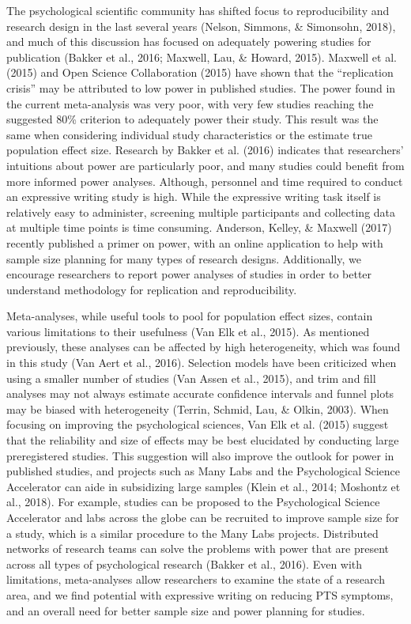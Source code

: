 \documentclass[man, mask]{apa6}
\theoremstyle{definition}
\theoremstyle{definition}
\theoremstyle{definition}
\theoremstyle{remark}
\begin{document}
The psychological scientific community has shifted focus to
reproducibility and research design in the last several years (Nelson,
Simmons, \& Simonsohn, 2018), and much of this discussion has focused on
adequately powering studies for publication (Bakker et al., 2016;
Maxwell, Lau, \& Howard, 2015). Maxwell et al. (2015) and Open Science
Collaboration (2015) have shown that the \enquote{replication crisis}
may be attributed to low power in published studies. The power found in
the current meta-analysis was very poor, with very few studies reaching
the suggested 80\% criterion to adequately power their study. This
result was the same when considering individual study characteristics or
the estimate true population effect size. Research by Bakker et al.
(2016) indicates that researchers' intuitions about power are
particularly poor, and many studies could benefit from more informed
power analyses. Although, personnel and time required to conduct an
expressive writing study is high. While the expressive writing task
itself is relatively easy to administer, screening multiple participants
and collecting data at multiple time points is time consuming. Anderson,
Kelley, \& Maxwell (2017) recently published a primer on power, with an
online application to help with sample size planning for many types of
research designs. Additionally, we encourage researchers to report power
analyses of studies in order to better understand methodology for
replication and reproducibility.

Meta-analyses, while useful tools to pool for population effect sizes,
contain various limitations to their usefulness (Van Elk et al., 2015).
As mentioned previously, these analyses can be affected by high
heterogeneity, which was found in this study (Van Aert et al., 2016).
Selection models have been criticized when using a smaller number of
studies (Van Assen et al., 2015), and trim and fill analyses may not
always estimate accurate confidence intervals and funnel plots may be
biased with heterogeneity (Terrin, Schmid, Lau, \& Olkin, 2003). When
focusing on improving the psychological sciences, Van Elk et al. (2015)
suggest that the reliability and size of effects may be best elucidated
by conducting large preregistered studies. This suggestion will also
improve the outlook for power in published studies, and projects such as
Many Labs and the Psychological Science Accelerator can aide in
subsidizing large samples (Klein et al., 2014; Moshontz et al., 2018).
For example, studies can be proposed to the Psychological Science
Accelerator and labs across the globe can be recruited to improve sample
size for a study, which is a similar procedure to the Many Labs
projects. Distributed networks of research teams can solve the problems
with power that are present across all types of psychological research
(Bakker et al., 2016). Even with limitations, meta-analyses allow
researchers to examine the state of a research area, and we find
potential with expressive writing on reducing PTS symptoms, and an
overall need for better sample size and power planning for studies.
\end{document}
